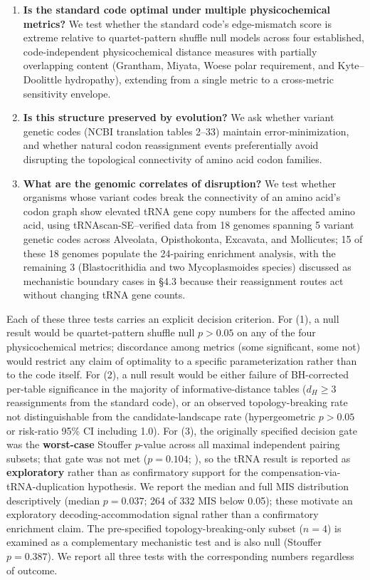 \documentclass[preprint,11pt,authoryear,a4paper]{elsarticle}
\begin{document}
\begin{enumerate}
\item
  \textbf{Is the standard code optimal under multiple physicochemical
  metrics?} We test whether the standard code's edge-mismatch score is
  extreme relative to quartet-pattern shuffle null models across four
  established, code-independent physicochemical distance measures with
  partially overlapping content (Grantham, Miyata, Woese polar
  requirement, and Kyte--Doolittle hydropathy), extending
  \citep{freeland1998} from a single metric to a cross-metric
  sensitivity envelope.
\item
  \textbf{Is this structure preserved by evolution?} We ask whether
  variant genetic codes (NCBI translation tables 2--33) maintain
  error-minimization, and whether natural codon reassignment events
  preferentially avoid disrupting the topological connectivity of amino
  acid codon families.
\item
  \textbf{What are the genomic correlates of disruption?} We test
  whether organisms whose variant codes break the connectivity of an
  amino acid's codon graph show elevated tRNA gene copy numbers for the
  affected amino acid, using tRNAscan-SE--verified data from 18 genomes
  spanning 5 variant genetic codes across Alveolata, Opisthokonta,
  Excavata, and Mollicutes; 15 of these 18 genomes populate the
  24-pairing enrichment analysis, with the remaining 3 (Blastocrithidia
  and two Mycoplasmoides species) discussed as mechanistic boundary
  cases in §4.3 because their reassignment routes act without changing
  tRNA gene counts.
\end{enumerate}

Each of these three tests carries an explicit decision criterion. For
(1), a null result would be quartet-pattern shuffle null \(p > 0.05\) on
any of the four physicochemical metrics; discordance among metrics (some
significant, some not) would restrict any claim of optimality to a
specific parameterization rather than to the code itself. For (2), a
null result would be either failure of BH-corrected per-table
significance in the majority of informative-distance tables
(\(d_{H} \geq 3\) reassignments from the standard code), or an observed
topology-breaking rate not distinguishable from the candidate-landscape
rate (hypergeometric \(p > 0.05\) or risk-ratio 95\% CI including 1.0).
For (3), the originally specified decision gate was the
\textbf{worst-case} Stouffer \(p\)-value across all maximal independent
pairing subsets; that gate was not met (\(p = 0.104\);
), so the tRNA result is reported as
\textbf{exploratory} rather than as confirmatory support for the
compensation-via-tRNA-duplication hypothesis. We report the median and
full MIS distribution descriptively (median \(p = 0.037\); 264 of 332
MIS below 0.05); these motivate an exploratory decoding-accommodation
signal rather than a confirmatory enrichment claim. The pre-specified
topology-breaking-only subset (\(n = 4\)) is examined as a complementary
mechanistic test and is also null (Stouffer \(p = 0.387\)). We report
all three tests with the corresponding numbers regardless of outcome.
\end{document}
